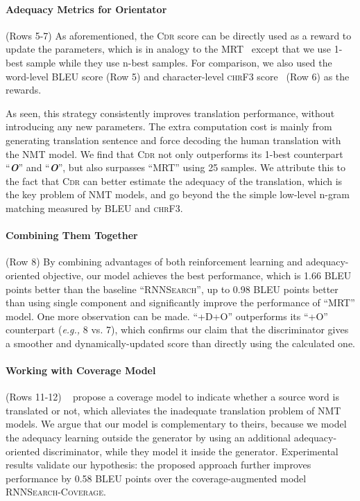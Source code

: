 \documentclass[letterpaper]{article} \usepackage{aaai19}  \usepackage{times}  \usepackage{helvet}  \usepackage{courier}  \usepackage{url}  \usepackage{graphicx}  \frenchspacing  \setlength{\pdfpagewidth}{8.5in}  \setlength{\pdfpageheight}{11in}  \usepackage{amsmath}
\begin{document}
\paragraph{\bf Adequacy Metrics for Orientator} (Rows 5-7)
As aforementioned, the \textsc{Cdr} score can be directly used as a reward to update the parameters, which is in analogy to the MRT~\cite{Shen:2016:ACL} except that we use 1-best sample while they use n-best samples. For comparison, we also used the word-level BLEU score (Row 5) and character-level \textsc{chrF3} score~\cite{popovic2015chrf} (Row 6) as the rewards.

As seen, this strategy consistently improves translation performance, without introducing any new parameters. The extra computation cost is mainly from generating translation sentence and force decoding the human translation with the NMT model.
We find that \textsc{Cdr} not only outperforms its 1-best counterpart ``{\bf \em O}'' and ``{\bf \em O}'', but also surpasses ``MRT'' using 25 samples. 
We attribute this to the fact that \textsc{Cdr} can better estimate the adequacy of the translation, which is the key problem of NMT models, and go beyond the  the simple low-level n-gram matching measured by BLEU and \textsc{chrF3}.


\paragraph{\bf Combining Them Together} (Row 8)
By combining advantages of both reinforcement learning and adequacy-oriented objective, our model achieves the best performance, which is 1.66 BLEU points better than the baseline ``\textsc{RNNSearch}'',  up to 0.98 BLEU points better than using single component and significantly improve the performance of ``MRT'' model.
One more observation can be made. ``+D+O'' outperforms its ``+O'' counterpart (\emph{e.g.,}\xspace 8 vs. 7), which confirms our claim that the discriminator gives a smoother and dynamically-updated score than directly using the calculated one.

\paragraph{\bf Working with Coverage Model} (Rows 11-12)
\citeauthor{tu2016modeling}~ propose a coverage model to indicate whether a source word is translated or not, which alleviates the inadequate translation problem of NMT models. We argue that our model is complementary to theirs, because we model the adequacy learning outside the generator by using an additional adequacy-oriented discriminator, while they model it inside the generator.
Experimental results validate our hypothesis: the proposed approach further improves performance by 0.58 BLEU points over the coverage-augmented model \textsc{RNNSearch-Coverage}.
\end{document}
